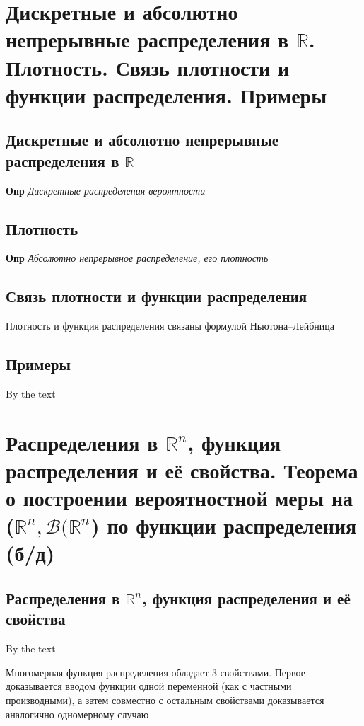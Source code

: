 \documentclass[a4paper, 14pt]{article}
\begin{document}
    \section{Дискретные и абсолютно непрерывные распределения в $\mathbb{R}$.
    Плотность.
    Связь плотности и функции распределения.
    Примеры}
    
    \subsection{Дискретные и абсолютно непрерывные распределения в $\mathbb{R}$}
    
    \textbf{Опр} \textit{Дискретные распределения вероятности}
    
    \subsection{Плотность}
    
    \textbf{Опр} \textit{Абсолютно непрерывное распределение, его плотность}
    
    \subsection{Связь плотности и функции распределения}
    
    Плотность и функция распределения связаны формулой Ньютона--Лейбница
    
    \subsection{Примеры}
    
    By the text
    
    \section{Распределения в $\mathbb{R}^n$, функция распределения и её свойства.
    Теорема о построении вероятностной меры на ($\mathbb{R}^n, \mathcal{B}(\mathbb{R}^n$) по функции распределения
        (б/д)}
    
    \subsection{Распределения в $\mathbb{R}^n$, функция распределения и её свойства}
    
    By the text
    
    Многомерная функция распределения обладает 3 свойствами.
    Первое доказывается вводом функции одной переменной (как с частными производными), а затем совместно с остальным
    свойствами доказывается аналогично одномерному случаю
    
\end{document}
